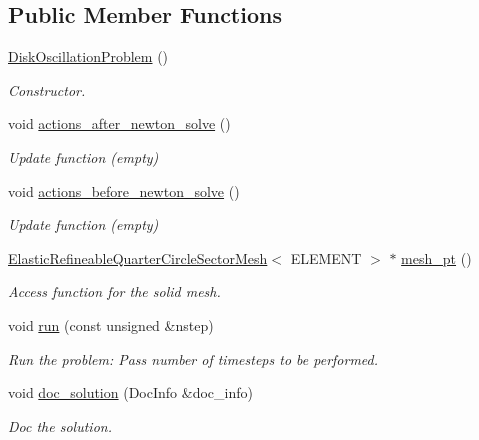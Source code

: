\subsection*{Public Member Functions}
\begin{DoxyCompactItemize}
\item 
\hyperlink{classDiskOscillationProblem_a5ce89d95d655d8c5b579171c8e9a54b9}{Disk\+Oscillation\+Problem} ()
\begin{DoxyCompactList}\small\item\em Constructor. \end{DoxyCompactList}\item 
void \hyperlink{classDiskOscillationProblem_a84fdc4311e8cc1fa5f80dc5568c88413}{actions\+\_\+after\+\_\+newton\+\_\+solve} ()
\begin{DoxyCompactList}\small\item\em Update function (empty) \end{DoxyCompactList}\item 
void \hyperlink{classDiskOscillationProblem_afea297af1844657099dec3d717fcccc5}{actions\+\_\+before\+\_\+newton\+\_\+solve} ()
\begin{DoxyCompactList}\small\item\em Update function (empty) \end{DoxyCompactList}\item 
\hyperlink{classElasticRefineableQuarterCircleSectorMesh}{Elastic\+Refineable\+Quarter\+Circle\+Sector\+Mesh}$<$ E\+L\+E\+M\+E\+NT $>$ $\ast$ \hyperlink{classDiskOscillationProblem_a9de851f400e5c161c5abf8efb2f2b082}{mesh\+\_\+pt} ()
\begin{DoxyCompactList}\small\item\em Access function for the solid mesh. \end{DoxyCompactList}\item 
void \hyperlink{classDiskOscillationProblem_ac0f7b36ffffa73ee49bc95bd961835dd}{run} (const unsigned \&nstep)
\begin{DoxyCompactList}\small\item\em Run the problem\+: Pass number of timesteps to be performed. \end{DoxyCompactList}\item 
void \hyperlink{classDiskOscillationProblem_adf6e2bf1843d5f5e3fa7b2fc5fb129a8}{doc\+\_\+solution} (Doc\+Info \&doc\+\_\+info)
\begin{DoxyCompactList}\small\item\em Doc the solution. \end{DoxyCompactList}\end{DoxyCompactItemize}
